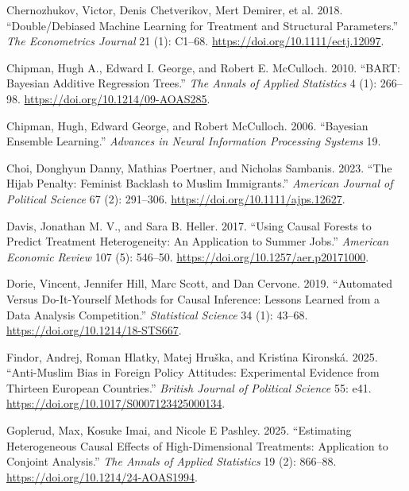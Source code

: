 \documentclass[
  10pt,
  a4paper,
  DIV=11,
  numbers=noendperiod]{scrartcl}
\newlength{\cslhangindent}
\newenvironment{CSLReferences}[2] %
 {\begin{list}{}{%
  \setlength{\itemindent}{0pt}
  \setlength{\leftmargin}{0pt}
  \setlength{\parsep}{0pt}
  \ifodd #1
   \setlength{\leftmargin}{\cslhangindent}
   \setlength{\itemindent}{-1\cslhangindent}
  \fi
  \setlength{\itemsep}{#2\baselineskip}}}
 {\end{list}}
\begin{document}
\begin{CSLReferences}{1}{1}
Chernozhukov, Victor, Denis Chetverikov, Mert Demirer, et al. 2018.
{``Double/Debiased Machine Learning for Treatment and Structural
Parameters.''} \emph{The Econometrics Journal} 21 (1): C1--68.
\url{https://doi.org/10.1111/ectj.12097}.

Chipman, Hugh A., Edward I. George, and Robert E. McCulloch. 2010.
{``{BART: Bayesian Additive Regression Trees}.''} \emph{The Annals of
Applied Statistics} 4 (1): 266--98.
\url{https://doi.org/10.1214/09-AOAS285}.

Chipman, Hugh, Edward George, and Robert McCulloch. 2006. {``Bayesian
Ensemble Learning.''} \emph{Advances in Neural Information Processing
Systems} 19.

Choi, Donghyun Danny, Mathias Poertner, and Nicholas Sambanis. 2023.
{``The Hijab Penalty: Feminist Backlash to Muslim Immigrants.''}
\emph{American Journal of Political Science} 67 (2): 291--306.
\url{https://doi.org/10.1111/ajps.12627}.

Davis, Jonathan M. V., and Sara B. Heller. 2017. {``Using Causal Forests
to Predict Treatment Heterogeneity: An Application to Summer Jobs.''}
\emph{American Economic Review} 107 (5): 546--50.
\url{https://doi.org/10.1257/aer.p20171000}.

Dorie, Vincent, Jennifer Hill, Marc Scott, and Dan Cervone. 2019.
{``Automated Versus Do-It-Yourself Methods for Causal Inference: Lessons
Learned from a Data Analysis Competition.''} \emph{Statistical Science}
34 (1): 43--68. \url{https://doi.org/10.1214/18-STS667}.

Findor, Andrej, Roman Hlatky, Matej Hruška, and Kristı́na Kironská. 2025.
{``Anti-Muslim Bias in Foreign Policy Attitudes: Experimental Evidence
from Thirteen European Countries.''} \emph{British Journal of Political
Science} 55: e41. \url{https://doi.org/10.1017/S0007123425000134}.

Goplerud, Max, Kosuke Imai, and Nicole E Pashley. 2025. {``Estimating
Heterogeneous Causal Effects of High-Dimensional Treatments: Application
to Conjoint Analysis.''} \emph{The Annals of Applied Statistics} 19 (2):
866--88. \url{https://doi.org/10.1214/24-AOAS1994}.


\end{CSLReferences}
\end{document}
